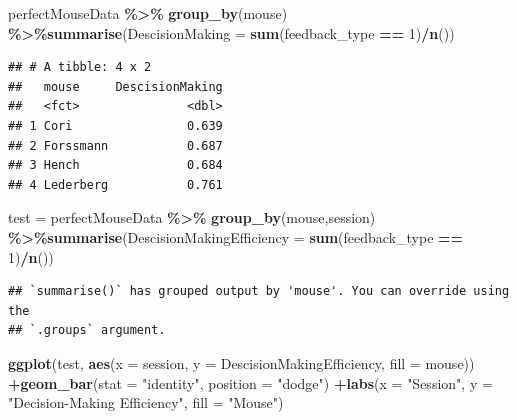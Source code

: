 \documentclass[
]{article}
\newenvironment{Shaded}{\begin{snugshade}}{\end{snugshade}}
\newcommand{\AttributeTok}[1]{\textcolor[rgb]{0.13,0.29,0.53}{#1}}
\newcommand{\DecValTok}[1]{\textcolor[rgb]{0.00,0.00,0.81}{#1}}
\newcommand{\FunctionTok}[1]{\textcolor[rgb]{0.13,0.29,0.53}{\textbf{#1}}}
\newcommand{\NormalTok}[1]{#1}
\newcommand{\OtherTok}[1]{\textcolor[rgb]{0.56,0.35,0.01}{#1}}
\newcommand{\SpecialCharTok}[1]{\textcolor[rgb]{0.81,0.36,0.00}{\textbf{#1}}}
\newcommand{\StringTok}[1]{\textcolor[rgb]{0.31,0.60,0.02}{#1}}
\begin{document}
\begin{Shaded}
\begin{Highlighting}[]
\NormalTok{perfectMouseData }\SpecialCharTok{\%\textgreater{}\%} \FunctionTok{group\_by}\NormalTok{(mouse) }\SpecialCharTok{\%\textgreater{}\%}\FunctionTok{summarise}\NormalTok{(}\AttributeTok{DescisionMaking =} \FunctionTok{sum}\NormalTok{(feedback\_type }\SpecialCharTok{==} \DecValTok{1}\NormalTok{)}\SpecialCharTok{/}\FunctionTok{n}\NormalTok{()) }
\end{Highlighting}
\end{Shaded}

\begin{verbatim}
## # A tibble: 4 x 2
##   mouse     DescisionMaking
##   <fct>               <dbl>
## 1 Cori                0.639
## 2 Forssmann           0.687
## 3 Hench               0.684
## 4 Lederberg           0.761
\end{verbatim}

\begin{Shaded}
\begin{Highlighting}[]
\NormalTok{test }\OtherTok{=}\NormalTok{ perfectMouseData }\SpecialCharTok{\%\textgreater{}\%} \FunctionTok{group\_by}\NormalTok{(mouse,session) }\SpecialCharTok{\%\textgreater{}\%}\FunctionTok{summarise}\NormalTok{(}\AttributeTok{DescisionMakingEfficiency =} \FunctionTok{sum}\NormalTok{(feedback\_type }\SpecialCharTok{==} \DecValTok{1}\NormalTok{)}\SpecialCharTok{/}\FunctionTok{n}\NormalTok{()) }
\end{Highlighting}
\end{Shaded}

\begin{verbatim}
## `summarise()` has grouped output by 'mouse'. You can override using the
## `.groups` argument.
\end{verbatim}

\begin{Shaded}
\begin{Highlighting}[]
\FunctionTok{ggplot}\NormalTok{(test, }\FunctionTok{aes}\NormalTok{(}\AttributeTok{x =}\NormalTok{ session, }\AttributeTok{y =}\NormalTok{ DescisionMakingEfficiency, }\AttributeTok{fill =}\NormalTok{ mouse)) }\SpecialCharTok{+}\FunctionTok{geom\_bar}\NormalTok{(}\AttributeTok{stat =} \StringTok{"identity"}\NormalTok{, }\AttributeTok{position =} \StringTok{"dodge"}\NormalTok{) }\SpecialCharTok{+}\FunctionTok{labs}\NormalTok{(}\AttributeTok{x =} \StringTok{"Session"}\NormalTok{, }\AttributeTok{y =} \StringTok{"Decision{-}Making Efficiency"}\NormalTok{, }\AttributeTok{fill =} \StringTok{"Mouse"}\NormalTok{)}
\end{Highlighting}
\end{Shaded}
\end{document}
